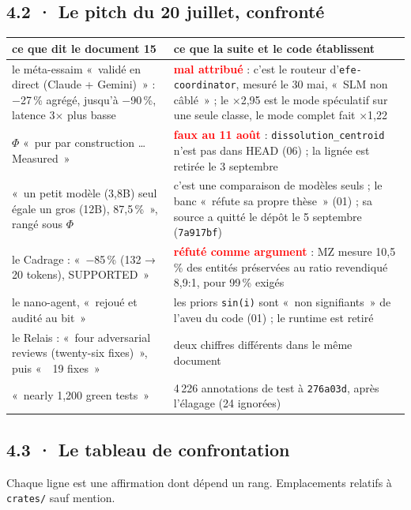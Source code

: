 \documentclass[10pt]{article}
\newcommand{\code}[1]{\texttt{\small #1}}
\newcommand{\ko}[1]{\textcolor{red}{\textbf{#1}}}
\newcommand{\x}{$\times$}
\newcommand{\pc}{\,\%}
\begin{document}
\subsection{4.2 · Le pitch du 20 juillet, confronté}

{\small
\renewcommand{\arraystretch}{1.15}
\begin{longtable}{@{}L{6.6cm}L{10.6cm}@{}}
\toprule
\textbf{ce que dit le document 15} & \textbf{ce que la suite et le code établissent} \\ \midrule \endhead
le méta-essaim «~validé en direct (Claude + Gemini)~» : $-$27\pc{} agrégé, jusqu'à $-$90\pc{}, latence 3\x{} plus basse & \ko{mal attribué} : c'est le routeur d'\code{efe-coordinator}, mesuré le 30 mai, «~SLM non câblé~» ; le \x2,95 est le mode spéculatif sur une seule classe, le mode complet fait \x1,22 \\
$\Phi$ «~pur par construction … Measured~» & \ko{faux au 11 août} : \code{dissolution\_centroid} n'est pas dans HEAD (06) ; la lignée est retirée le 3 septembre \\
«~un petit modèle (3,8B) seul égale un gros (12B), 87,5\pc{}~», rangé sous $\Phi$ & c'est une comparaison de modèles seuls ; le banc «~réfute sa propre thèse~» (01) ; sa source a quitté le dépôt le 5 septembre (\code{7a917bf}) \\
le Cadrage : «~$-$85\pc{} (132 → 20 tokens), SUPPORTED~» & \ko{réfuté comme argument} : MZ mesure 10,5\pc{} des entités préservées au ratio revendiqué 8,9:1, pour 99\pc{} exigés \\
le nano-agent, «~rejoué et audité au bit~» & les priors \code{sin(i)} sont «~non signifiants~» de l'aveu du code (01) ; le runtime est retiré \\
le Relais : «~four adversarial reviews (twenty-six fixes)~», puis «~~19 fixes~» & deux chiffres différents dans le même document \\
«~nearly 1,200 green tests~» & 4\,226 annotations de test à \code{276a03d}, après l'élagage (24 ignorées) \\
\bottomrule
\end{longtable}
}

\subsection{4.3 · Le tableau de confrontation}

Chaque ligne est une affirmation dont dépend un rang. Emplacements relatifs à \code{crates/} sauf mention.
\end{document}
